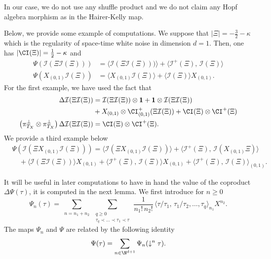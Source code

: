 \documentclass[11pt]{preprint}
\newcommand{\mcI}{\mathcal{I}}
\def\one{\mathbf{1}}
\renewcommand{\lg}{\langle}
\newcommand{\rg}{\rangle}
\begin{document}
	In our case, we do not use any shuffle product and we do not claim any Hopf algebra morphism as in the Hairer-Kelly map. 
	\begin{example} Below, we provide some example of computations. We suppose that $|\Xi| = - \frac{3}{2}-\kappa$ which is the regularity of space-time white noise in dimension $d=1$. Then, one has $ | \CI(\Xi) |  = \frac{1}{2}-\kappa$ and  
		\begin{align*}
		\Psi\left( \mcI(\Xi\mcI(\Xi)) \right) &=  \lg \mcI(\Xi\mcI(\Xi)))\rg + \lg \mcI^+(\Xi) , \, \mcI(\Xi) \rg
	\\
		\Psi\left(X_{(0,1)}\mcI(\Xi) \right) &= \lg X_{(0,1)}\mcI(\Xi)\rg + \lg \mcI(\Xi)\rg X_{(0,1)}.
	\end{align*}
	For the first example, we have used the fact that
	\begin{equation*}\begin{aligned}
 \Delta \mcI(\Xi\mcI(\Xi))   &=  \mcI(\Xi\mcI(\Xi)) \otimes \one + \one \otimes \mcI(\Xi\mcI(\Xi)) \\ & +
X_{(0,1)} \otimes \CI_{(0,1)}^+(\Xi\mcI(\Xi))   + 
\CI(\Xi) \otimes \CI^+(\Xi) 
			\\
 \left( \pi^{\perp}_{T_X} \otimes \pi^{\perp}_{T_X} \right)		\Delta \mcI(\Xi\mcI(\Xi))  & =  \CI(\Xi) \otimes \CI^+(\Xi).
	\end{aligned}
	\end{equation*}
	We provide a third example below
\begin{align*}
			& \Psi\left( \mcI(\Xi X_{(0,1)}\mcI(\Xi))\right) =  \lg \mcI(\Xi X_{(0,1)}\mcI(\Xi))\rg  + \lg \mcI^+(\Xi) , \, \mcI(X_{(0,1)}\Xi) \rg
			\\
			&\quad + \lg \mcI(\Xi \mcI(\Xi))\rg X_{(0,1)}+\lg \mcI^+(\Xi) , \, \mcI(\Xi) \rg X_{(0,1)} + \lg \mcI^+(\Xi) , \, \mcI(\Xi) \rg_{(0,1)}.
		\end{align*}
	\end{example}
	

	
	
	It will be useful in later computations to have in hand the value of the coproduct $\Delta\Psi(\tau)$, it is computed in the next lemma. We first introduce for $n\geq0$
	$$
	\Psi_n(\tau) = \sum_{\substack{n=n_1+n_2}} \sum_{\substack{q\geq 0 \\ \tau_q\prec\dots\prec\tau_1\prec\tau}} \, \frac{1}{n_1!\, n_2!} \, \big\lg \tau/\tau_1,\, \tau_1/\tau_2, \dots, \tau_q \big\rg_{n_1} X^{n_2}.
	$$
	The maps $\Psi_n$ and $\Psi$ are related by the following identity
	\begin{equation}\label{eq_PsinAndPsi}
		\Psi(\tau) = \sum_{n\in \N^{d+1}} \Psi_n(\downarrow^n\tau).
	\end{equation}
	
\end{document}
